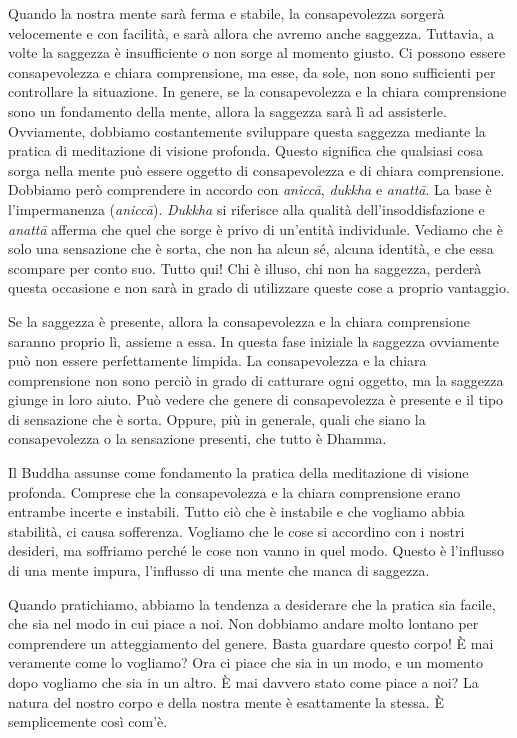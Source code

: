 Quando la nostra mente sarà ferma e stabile, la consapevolezza sorgerà
velocemente e con facilità, e sarà allora che avremo anche saggezza.
Tuttavia, a volte la saggezza è insufficiente o non sorge al momento
giusto. Ci possono essere consapevolezza e chiara comprensione, ma esse,
da sole, non sono sufficienti per controllare la situazione. In genere,
se la consapevolezza e la chiara comprensione sono un fondamento della
mente, allora la saggezza sarà lì ad assisterle. Ovviamente, dobbiamo
costantemente sviluppare questa saggezza mediante la pratica di
meditazione di visione profonda. Questo significa che qualsiasi cosa
sorga nella mente può essere oggetto di consapevolezza e di chiara
comprensione. Dobbiamo però comprendere in accordo con \emph{aniccā},
\emph{dukkha} e \emph{anattā}. La base è l'impermanenza (\emph{aniccā}).
\emph{Dukkha} si riferisce alla qualità dell'insoddisfazione e
\emph{anattā} afferma che quel che sorge è privo di un'entità
individuale. Vediamo che è solo una sensazione che è sorta, che non ha
alcun sé, alcuna identità, e che essa scompare per conto suo. Tutto qui!
Chi è illuso, chi non ha saggezza, perderà questa occasione e non sarà
in grado di utilizzare queste cose a proprio vantaggio.

Se la saggezza è presente, allora la consapevolezza e la chiara
comprensione saranno proprio lì, assieme a essa. In questa fase iniziale
la saggezza ovviamente può non essere perfettamente limpida. La
consapevolezza e la chiara comprensione non sono perciò in grado di
catturare ogni oggetto, ma la saggezza giunge in loro aiuto. Può vedere
che genere di consapevolezza è presente e il tipo di sensazione che è
sorta. Oppure, più in generale, quali che siano la consapevolezza o la
sensazione presenti, che tutto è Dhamma.

Il Buddha assunse come fondamento la pratica della meditazione di
visione profonda. Comprese che la consapevolezza e la chiara
comprensione erano entrambe incerte e instabili. Tutto ciò che è
instabile e che vogliamo abbia stabilità, ci causa sofferenza. Vogliamo
che le cose si accordino con i nostri desideri, ma soffriamo perché le
cose non vanno in quel modo. Questo è l'influsso di una mente impura,
l'influsso di una mente che manca di saggezza.

Quando pratichiamo, abbiamo la tendenza a desiderare che la pratica sia
facile, che sia nel modo in cui piace a noi. Non dobbiamo andare molto
lontano per comprendere un atteggiamento del genere. Basta guardare
questo corpo! È mai veramente come lo vogliamo? Ora ci piace che sia in
un modo, e un momento dopo vogliamo che sia in un altro. È mai davvero
stato come piace a noi? La natura del nostro corpo e della nostra mente
è esattamente la stessa. È semplicemente così com'è.

